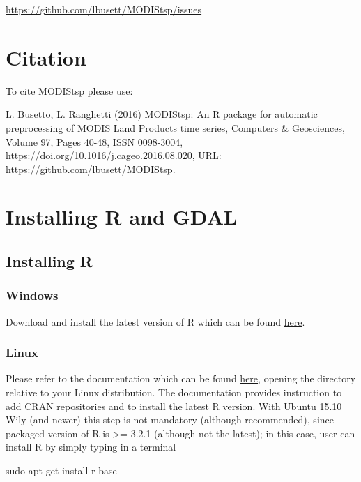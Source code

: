 \documentclass[]{article}
\newenvironment{Shaded}{\begin{snugshade}}{\end{snugshade}}
\newcommand{\FunctionTok}[1]{\textcolor[rgb]{0.00,0.00,0.00}{#1}}
\newcommand{\NormalTok}[1]{#1}
\begin{document}
\url{https://github.com/lbusett/MODIStsp/issues}

\section{Citation}\label{citation}

To cite MODIStsp please use:

L. Busetto, L. Ranghetti (2016) MODIStsp: An R package for automatic
preprocessing of MODIS Land Products time series, Computers \&
Geosciences, Volume 97, Pages 40-48, ISSN 0098-3004,
\url{https://doi.org/10.1016/j.cageo.2016.08.020}, URL:
\url{https://github.com/lbusett/MODIStsp}.

\hypertarget{installing-r-and-gdal}{\section{Installing R and
GDAL}\label{installing-r-and-gdal}}

\subsection{Installing R}\label{installing-r}

\subsubsection{Windows}\label{windows}

Download and install the latest version of R which can be found
\href{https://cran.r-project.org/bin/windows/base}{here}.

\subsubsection{Linux}\label{linux}

Please refer to the documentation which can be found
\href{https://cran.r-project.org/bin/linux}{here}, opening the directory
relative to your Linux distribution. The documentation provides
instruction to add CRAN repositories and to install the latest R
version. With Ubuntu 15.10 Wily (and newer) this step is not mandatory
(although recommended), since packaged version of R is \textgreater{}=
3.2.1 (although not the latest); in this case, user can install R by
simply typing in a terminal

\begin{Shaded}
\begin{Highlighting}[]
\FunctionTok{sudo}\NormalTok{ apt-get install r-base}
\end{Highlighting}
\end{Shaded}
\end{document}
